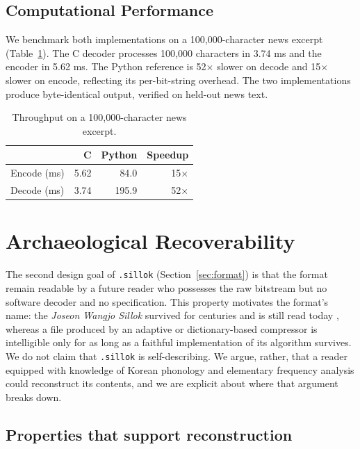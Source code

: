 \documentclass[conference]{IEEEtran}
\begin{document}
\subsection{Computational Performance}

We benchmark both implementations on a 100{,}000-character news excerpt
(Table~\ref{tab:bench}). The C decoder processes 100{,}000 characters in
3.74 ms and the encoder in 5.62 ms. The Python reference is 52$\times$ slower on
decode and 15$\times$ slower on encode, reflecting its per-bit-string overhead.
The two implementations produce byte-identical output, verified on held-out
news text.

\begin{table}[H]
\centering
\caption{Throughput on a 100{,}000-character news excerpt.}
\label{tab:bench}
\begin{tabular}{lrrr}
\toprule
 & C & Python & Speedup \\
\midrule
Encode (ms) & 5.62 & 84.0 & 15$\times$ \\
Decode (ms) & 3.74 & 195.9 & 52$\times$ \\
\bottomrule
\end{tabular}
\end{table}

\section{Archaeological Recoverability}
\label{sec:archaeological}

The second design goal of \texttt{.sillok} (Section~\ref{sec:format}) is that
the format remain readable by a future reader who possesses the raw bitstream
but no software decoder and no specification. This property motivates the
format's name: the \emph{Joseon Wangjo Sillok} survived for centuries and is
still read today \cite{sillok}, whereas a file produced by an adaptive or
dictionary-based compressor is intelligible only for as long as a faithful
implementation of its algorithm survives. We do not claim that \texttt{.sillok}
is self-describing. We argue, rather, that a reader equipped with knowledge of
Korean phonology and elementary frequency analysis could reconstruct its
contents, and we are explicit about where that argument breaks down.

\subsection{Properties that support reconstruction}
\end{document}

